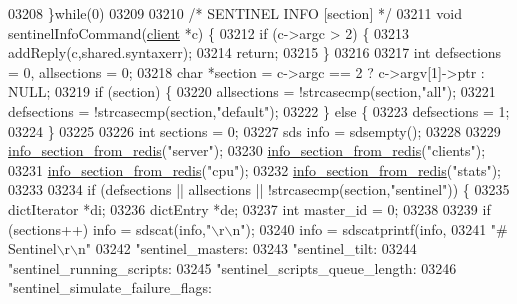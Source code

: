 \begin{DoxyCode}
{{{{{{{{{{{{{{{{{{{{{{{{{{{{{{{{{{{{{{{{{{{{{{{{{{{{{{{{{{{{{{{{03208 \textcolor{preprocessor}{\}}\textcolor{keywordflow}{while}\textcolor{preprocessor}{(}0\textcolor{preprocessor}{)}
03209 
03210 \textcolor{comment}{/* SENTINEL INFO [section] */}
03211 \textcolor{keywordtype}{void} sentinelInfoCommand(\hyperlink{structclient}{client} *c) \{
03212     \textcolor{keywordflow}{if} (c->argc > 2) \{
03213         addReply(c,shared.syntaxerr);
03214         \textcolor{keywordflow}{return};
03215     \}
03216 
03217     \textcolor{keywordtype}{int} defsections = 0, allsections = 0;
03218     \textcolor{keywordtype}{char} *section = c->argc == 2 ? c->argv[1]->ptr : NULL;
03219     \textcolor{keywordflow}{if} (section) \{
03220         allsections = !strcasecmp(section,\textcolor{stringliteral}{"all"});
03221         defsections = !strcasecmp(section,\textcolor{stringliteral}{"default"});
03222     \} \textcolor{keywordflow}{else} \{
03223         defsections = 1;
03224     \}
03225 
03226     \textcolor{keywordtype}{int} sections = 0;
03227     sds info = sdsempty();
03228 
03229     \hyperlink{sentinel_8c_a85a6933ebbf5e518c3767fcf950429b9}{info\_section\_from\_redis}(\textcolor{stringliteral}{"server"});
03230     \hyperlink{sentinel_8c_a85a6933ebbf5e518c3767fcf950429b9}{info\_section\_from\_redis}(\textcolor{stringliteral}{"clients"});
03231     \hyperlink{sentinel_8c_a85a6933ebbf5e518c3767fcf950429b9}{info\_section\_from\_redis}(\textcolor{stringliteral}{"cpu"});
03232     \hyperlink{sentinel_8c_a85a6933ebbf5e518c3767fcf950429b9}{info\_section\_from\_redis}(\textcolor{stringliteral}{"stats"});
03233 
03234     \textcolor{keywordflow}{if} (defsections || allsections || !strcasecmp(section,\textcolor{stringliteral}{"sentinel"})) \{
03235         dictIterator *di;
03236         dictEntry *de;
03237         \textcolor{keywordtype}{int} master\_id = 0;
03238 
03239         \textcolor{keywordflow}{if} (sections++) info = sdscat(info,\textcolor{stringliteral}{"\(\backslash\)r\(\backslash\)n"});
03240         info = sdscatprintf(info,
03241             \textcolor{stringliteral}{"# Sentinel\(\backslash\)r\(\backslash\)n"}
03242             \textcolor{stringliteral}{"sentinel\_masters:%
03243             \textcolor{stringliteral}{"sentinel\_tilt:%
03244             \textcolor{stringliteral}{"sentinel\_running\_scripts:%
03245             \textcolor{stringliteral}{"sentinel\_scripts\_queue\_length:%
03246             \textcolor{stringliteral}{"sentinel\_simulate\_failure\_flags:%
}}}}}}}}}}}}}}}}}}}}}}}}}}}}}}}}}}}}}}}}}}}}}}}}}}}}}}}}}}}}}}}}}}}}}
\end{DoxyCode}
